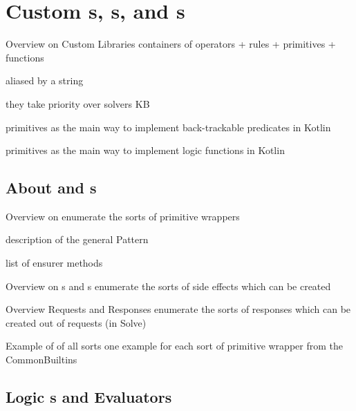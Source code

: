 \documentclass[handout]{beamer}
\begin{document}
\section{Custom s, s, and s}

\begin{frame}[allowframebreaks]{Overview on Custom Libraries}
    containers of operators + rules + primitives + functions

    aliased by a string

    they take priority over solvers KB

    primitives as the main way to implement back-trackable predicates in Kotlin

    primitives as the main way to implement logic functions in Kotlin
\end{frame}

\subsection{About  and s}

\begin{frame}[allowframebreaks]{Overview on }
    enumerate the sorts of primitive wrappers

    description of the general Pattern

    list of ensurer methods
\end{frame}

\begin{frame}[allowframebreaks]{Overview on s and s}
    enumerate the sorts of side effects which can be created

\end{frame}

\begin{frame}[allowframebreaks]{Overview Requests and Responses}
    enumerate the sorts of responses which can be created out of requests (in Solve)
\end{frame}

\begin{frame}[allowframebreaks]{Example of  of all sorts}
   one example for each sort of primitive wrapper from the CommonBuiltins
\end{frame}

\subsection{Logic s and Evaluators}
\end{document}
